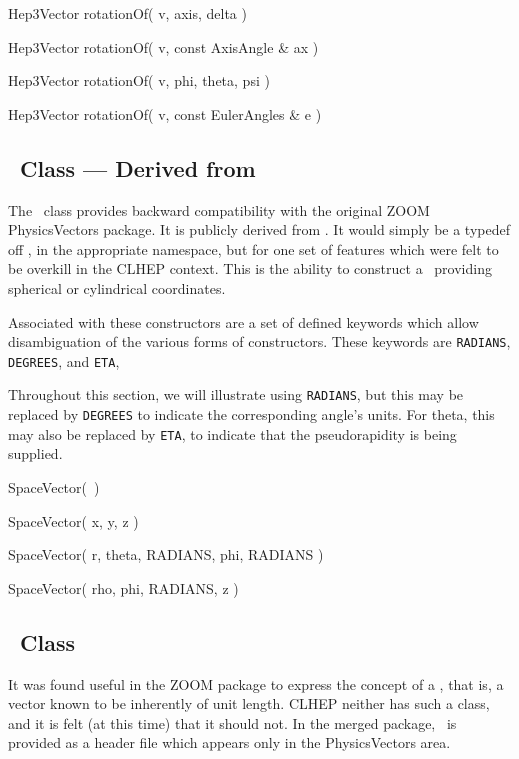 \begin{shortlist}
  \item Hep3Vector rotationOf( v, axis, delta ) \see{\ref{eq:axisrot}}
  \item Hep3Vector rotationOf( v, const AxisAngle \& ax ) \see{\ref{eq:axisrot}}
  \item Hep3Vector rotationOf( v, phi, theta, psi ) \see{\ref{eq:eulerrot}}
  \item Hep3Vector rotationOf( v, const EulerAngles \& e ) \see{\ref{eq:eulerrot}}
\end{shortlist}

\subsection{\protect\SVz\ Class --- Derived from \SV }

The \SVz\ class provides backward compatibility with the original ZOOM
PhysicsVectors package.  
It is publicly derived from \SV .
It would simply be a typedef off \SV , in the appropriate namespace, 
but for one set of features which were felt to be overkill in the 
CLHEP context.  
This is the ability to construct a \SVz\ providing spherical or cylindrical
coordinates.  

Associated with these constructors are a set of defined keywords which
allow disambiguation of the various forms of constructors.  
These keywords are {\tt RADIANS}, {\tt DEGREES}, and {\tt ETA}, 

Throughout this section, we will illustrate using {\tt RADIANS}, 
but this may be replaced by {\tt DEGREES}
to indicate the corresponding angle's units.
For theta, this may also be replaced by {\tt ETA}, to indicate that the
pseudorapidity is being supplied.

\begin{shortlist}
  \item SpaceVector(~)
  \item SpaceVector( x, y, z ) 
  \item SpaceVector( r, theta, RADIANS, phi, RADIANS ) \see{\ref{eq:polar}}
  \item SpaceVector( rho, phi, RADIANS, z ) \see{\ref{eq:cylindrical}}
\end{shortlist}


\subsection{\protect\UV\ Class}

It was found useful in the ZOOM package to express the concept of a 
\UV, that is, a vector known to be inherently of unit length.
CLHEP neither has such a class, and it is felt (at this time) that
it should not.  
In the merged package, 
\UV\ is provided as a header file which appears only in the PhysicsVectors 
area.  

